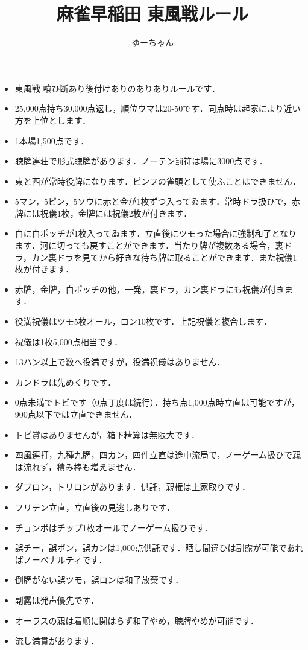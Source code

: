 \documentclass[uplatex]{jsarticle}
\theoremstyle{definition}
\begin{document}
\title{麻雀早稲田 東風戦ルール}
\author{ゆーちゃん}
\maketitle

\begin{itemize}
    \item 東風戦 喰ひ断あり後付けありのありありルールです．
    \item 25,000点持ち30,000点返し，順位ウマは20-50です．同点時は起家により近い方を上位とします．
    \item 1本場1,500点です．
    \item 聴牌連荘で形式聴牌があります．ノーテン罰符は場に3000点です．
    \item 東と西が常時役牌になります．ピンフの雀頭として使ふことはできません．
    \item 5マン，5ピン，5ソウに赤と金が1枚ずつ入ってゐます．常時ドラ扱ひで，赤牌には祝儀1枚，金牌には祝儀2枚が付きます．
    \item 白に白ポッチが1枚入ってゐます．立直後にツモった場合に強制和了となります．河に切っても戻すことができます．当たり牌が複数ある場合，裏ドラ，カン裏ドラを見てから好きな待ち牌に取ることができます．また祝儀1枚が付きます．
    \item 赤牌，金牌，白ポッチの他，一発，裏ドラ，カン裏ドラにも祝儀が付きます．
    \item 役満祝儀はツモ5枚オール，ロン10枚です．上記祝儀と複合します．
    \item 祝儀は1枚5,000点相当です．
    \item 13ハン以上で数へ役満ですが，役満祝儀はありません．
    \item カンドラは先めくりです．
    \item 0点未満でトビです（0点丁度は続行）．持ち点1,000点時立直は可能ですが，900点以下では立直できません．
    \item トビ賞はありませんが，箱下精算は無限大です．
    \item 四風連打，九種九牌，四カン，四件立直は途中流局で，ノーゲーム扱ひで親は流れず，積み棒も増えません．
    \item ダブロン，トリロンがあります．供託，親権は上家取りです．
    \item フリテン立直，立直後の見逃しありです．
    \item チョンボはチップ1枚オールでノーゲーム扱ひです．
    \item 誤チー，誤ポン，誤カンは1,000点供託です．晒し間違ひは副露が可能であればノーペナルティです．
    \item 倒牌がない誤ツモ，誤ロンは和了放棄です．
    \item 副露は発声優先です．
    \item オーラスの親は着順に関はらず和了やめ，聴牌やめが可能です．
    \item 流し満貫があります．
\end{itemize}
\end{document}
